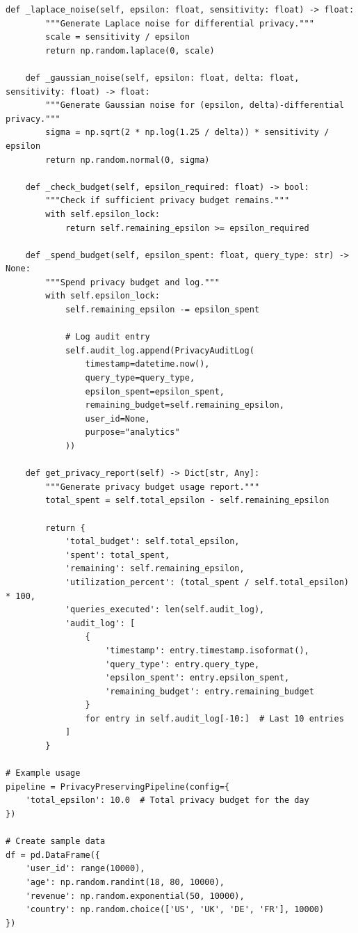 \begin{lstlisting}[style=python, caption=PrivacyPreservingPipeline with Differential Privacy]
    def _laplace_noise(self, epsilon: float, sensitivity: float) -> float:
        """Generate Laplace noise for differential privacy."""
        scale = sensitivity / epsilon
        return np.random.laplace(0, scale)

    def _gaussian_noise(self, epsilon: float, delta: float, sensitivity: float) -> float:
        """Generate Gaussian noise for (epsilon, delta)-differential privacy."""
        sigma = np.sqrt(2 * np.log(1.25 / delta)) * sensitivity / epsilon
        return np.random.normal(0, sigma)

    def _check_budget(self, epsilon_required: float) -> bool:
        """Check if sufficient privacy budget remains."""
        with self.epsilon_lock:
            return self.remaining_epsilon >= epsilon_required

    def _spend_budget(self, epsilon_spent: float, query_type: str) -> None:
        """Spend privacy budget and log."""
        with self.epsilon_lock:
            self.remaining_epsilon -= epsilon_spent

            # Log audit entry
            self.audit_log.append(PrivacyAuditLog(
                timestamp=datetime.now(),
                query_type=query_type,
                epsilon_spent=epsilon_spent,
                remaining_budget=self.remaining_epsilon,
                user_id=None,
                purpose="analytics"
            ))

    def get_privacy_report(self) -> Dict[str, Any]:
        """Generate privacy budget usage report."""
        total_spent = self.total_epsilon - self.remaining_epsilon

        return {
            'total_budget': self.total_epsilon,
            'spent': total_spent,
            'remaining': self.remaining_epsilon,
            'utilization_percent': (total_spent / self.total_epsilon) * 100,
            'queries_executed': len(self.audit_log),
            'audit_log': [
                {
                    'timestamp': entry.timestamp.isoformat(),
                    'query_type': entry.query_type,
                    'epsilon_spent': entry.epsilon_spent,
                    'remaining_budget': entry.remaining_budget
                }
                for entry in self.audit_log[-10:]  # Last 10 entries
            ]
        }

# Example usage
pipeline = PrivacyPreservingPipeline(config={
    'total_epsilon': 10.0  # Total privacy budget for the day
})

# Create sample data
df = pd.DataFrame({
    'user_id': range(10000),
    'age': np.random.randint(18, 80, 10000),
    'revenue': np.random.exponential(50, 10000),
    'country': np.random.choice(['US', 'UK', 'DE', 'FR'], 10000)
})


\end{lstlisting}
